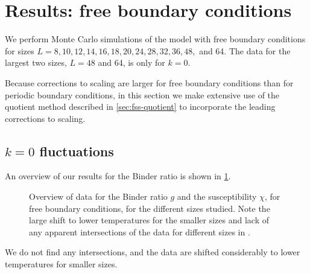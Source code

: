 \section{Results: free boundary conditions}
\label{sec:fss-results-fbc}

We perform Monte Carlo simulations of the model with free boundary
conditions for sizes $L=8,10,12,14,16,18,20,24,28,32,36,48,$ and 64.
The data for the largest two sizes, $L=48$ and 64, is only for $k=0$.

Because corrections to scaling are larger for free boundary conditions than for
periodic boundary conditions, in this section we make extensive use of the
quotient method described in \cref{sec:fss-quotient} to incorporate the
leading corrections to scaling.


\subsection{$k=0$ fluctuations}

An overview of our results for the Binder ratio is shown in
\cref{fig:data-f-binder}.
\begin{figure}
  \centering
  \begin{subfigure}{0.49\textwidth}
    \centering
    
    \subcaption{}\label{fig:data-f-binder}
  \end{subfigure}
  \begin{subfigure}{0.49\textwidth}
    \centering
    
    \subcaption{}\label{fig:data-f-susc}
  \end{subfigure}
  \caption[
    Data for the Binder ratio $g$ and the susceptibility $\chi$ for the
    five-dimensional Ising model with free boundary conditions.
  ]
  {
    Overview of data for  the Binder ratio $g$ and
     the susceptibility $\chi$, for free boundary
    conditions, for the different sizes studied. Note the large shift to lower
    temperatures for the smaller sizes and lack of any apparent intersections
    of the data for different sizes in .
  } \label{fig:data-f}
\end{figure}
We do not find any intersections, and the data are shifted considerably to
lower temperatures for smaller sizes.

